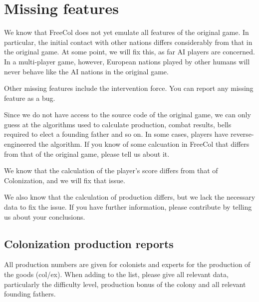 \documentclass[12pt]{book}
\begin{document}
\hypertarget{Missing features}{\chapter{Missing features}}

We know that FreeCol does not yet emulate all features of the original
game. In particular, the initial contact with other nations differs
considerably from that in the original game. At some point, we will
fix this, as far AI players are concerned. In a multi-player game,
however, European nations played by other humans will never behave
like the AI nations in the original game.

Other missing features include the intervention force. You can report
any missing feature as a bug.

Since we do not have access to the source code of the original game,
we can only guess at the algorithms used to calculate production,
combat results, bells required to elect a founding father and so
on. In some cases, players have reverse-engineered the algorithm. If
you know of some calcuation in FreeCol that differs from that of the
original game, please tell us about it.

We know that the calculation of the player's score differs from that
of Colonization, and we will fix that issue.

We also know that the calculation of production differs, but we lack
the necessary data to fix the issue. If you have further information,
please contribute by telling us about your conclusions.


\hypertarget{Colonization production reports}
            {\section{Colonization production reports}}


All production numbers are given for colonists and experts for the
production of the goods (col/ex). When adding to the list, please give
all relevant data, particularly the difficulty level, production bonus
of the colony and all relevant founding fathers.
\end{document}
